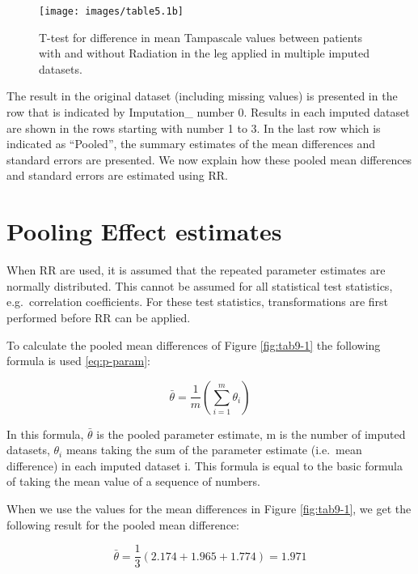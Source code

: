 \documentclass[
]{book}
\begin{document}
\begin{figure}

{\centering \texttt{[image: images/table5.1b]} 

}

\caption{T-test for difference in mean Tampascale values between patients with and without Radiation in the leg applied in multiple imputed datasets.}\label{fig:tab9-2}
\end{figure}

The result in the original dataset (including missing values) is presented in the row that is indicated by Imputation\_ number 0. Results in each imputed dataset are shown in the rows starting with number 1 to 3. In the last row which is indicated as ``Pooled'', the summary estimates of the mean differences and standard errors are presented. We now explain how these pooled mean differences and standard errors are estimated using RR.

\hypertarget{pooling-effect-estimates}{%
\section{Pooling Effect estimates}\label{pooling-effect-estimates}}

When RR are used, it is assumed that the repeated parameter estimates are normally distributed. This cannot be assumed for all statistical test statistics, e.g.~correlation coefficients. For these test statistics, transformations are first performed before RR can be applied.

To calculate the pooled mean differences of Figure \ref{fig:tab9-1} the following formula is used \eqref{eq:p-param}:

\begin{equation}
  \bar{\theta} = \frac{1}{m}\left (\sum_{i=1}^m{\theta_i}\right )
  \label{eq:p-param}
\end{equation}

In this formula, \(\bar{\theta}\) is the pooled parameter estimate, m is the number of imputed datasets, \(\theta_i\) means taking the sum of the parameter estimate (i.e.~mean difference) in each imputed dataset i. This formula is equal to the basic formula of taking the mean value of a sequence of numbers.

When we use the values for the mean differences in Figure \ref{fig:tab9-1}, we get the following result for the pooled mean difference:

\[\bar{\theta} = \frac{1}{3}(2.174 + 1.965+1.774)=1.971\]
\end{document}
